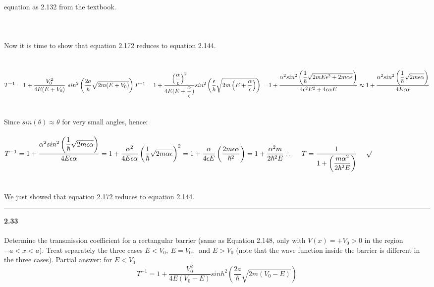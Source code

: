 \documentclass[fleqn]{article}
\begin{document}
{      equation as 2.132 from the textbook.  \\
      \\
      \\
      \\
      Now it is time to show that equation 2.172 reduces to equation 2.144. \\
      \\
      \\
      $
        T^{-1}=1+\dfrac{V^2_0}{4E(E+V_0)} ~ sin^2 \left(\dfrac{2a}{\hbar} \sqrt{2m(E+V_0)}\right) \\
        \\
        \\
        T^{-1}=1+\dfrac{\left(\dfrac{\alpha}{\epsilon}\right)^2}{4E(E+\dfrac{\alpha}{\epsilon})} sin^2\left(\dfrac{\epsilon}{\hbar} \sqrt{2m\left(E+\dfrac{\alpha}{\epsilon}\right)} \right)
        =1+\dfrac{  \alpha^2 sin^2 \left(  \dfrac{1}{\hbar}  \sqrt{2mE \epsilon^2+2m\alpha \epsilon}  \right)  }{4 \epsilon^2 E^2 +4 \epsilon \alpha E}
        \approx 1+\dfrac{\alpha^2 sin^2\left(\dfrac{1}{\hbar} \sqrt{2m\epsilon \alpha}\right)}{4E \epsilon \alpha}
      $ \\
      \\
      \\
      Since $sin(\theta) \approx \theta$ for very small angles, hence: \\
      \\
      $
        T^{-1}=1+\dfrac{\alpha^2 sin^2\left(\dfrac{1}{\hbar} \sqrt{2m\epsilon \alpha}\right)}{4E \epsilon \alpha}
        =1+\dfrac{\alpha^2}{4E\epsilon \alpha} \left(\dfrac{1}{\hbar} \sqrt{2m\alpha \epsilon}\right)^2
        =1+\dfrac{\alpha}{4 \epsilon E} \left(\dfrac{2m \epsilon \alpha}{\hbar^2}\right) 
        =1+\dfrac{\alpha^2 m}{2\hbar^2 E} \\
        \\
        \\
        \therefore ~~~~ T=\dfrac{1}{1+\left(\dfrac{m \alpha^2}{2\hbar^2 E}\right)} ~~~~ \surd
      $  \\
      \\
      \\
      We just showed that equation 2.172 reduces to equation 2.144.
    }

  \rule{15cm}{1pt}
  
  \textbf{2.33} \\ \\
  Determine the transmission coefficient for a rectangular barrier
  (same as Equation 2.148, only with $V(x)=+V_0 >0$ in the region $-a<x<a$).
  Treat separately the three cases $E<V_0, ~ E=V_0, ~ $ and $E>V_0$ 
  (note that the wave function inside the barrier is different in the three cases).
  Partial answer: for $E<V_0$
  $$T^{-1}=1+\dfrac{V^2_0}{4E(V_0-E)} sinh^2 \left(\dfrac{2a}{\hbar} \sqrt{2m(V_0-E)}\right)$$
\end{document}
